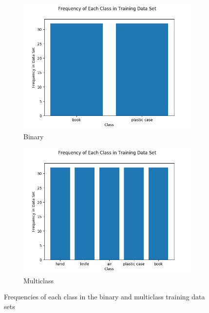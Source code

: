\documentclass[12pt]{article}
\begin{document}
\begin{figure}
\centering
\begin{subfigure}{.5\textwidth}
  \centering
  \includegraphics[width=\linewidth]{images/binaryfrequencies}
  \caption{Binary}
  \label{fig:sub1}
\end{subfigure}%
\begin{subfigure}{.5\textwidth}
  \centering
  \includegraphics[width=\linewidth]{images/multiclassfrequencies}
  \caption{Multiclass}
  \label{fig:sub2}
\end{subfigure}
\caption{Frequencies of each class in the binary and multiclass training data sets}
\label{fig:classdist}
\end{figure}
\end{document}
